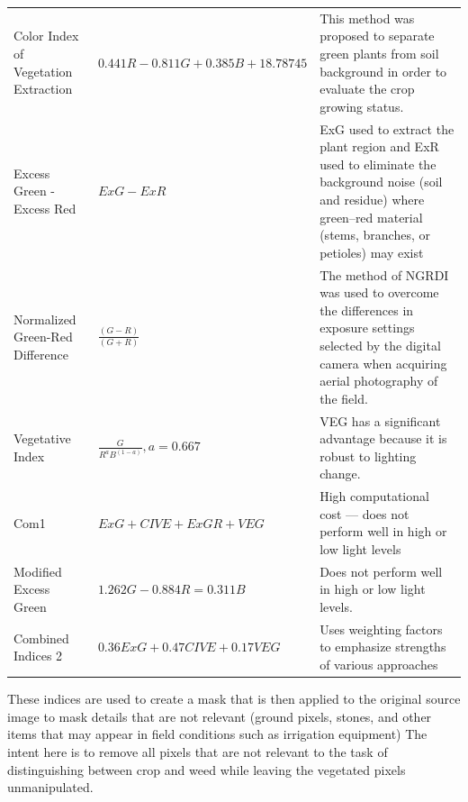 \documentclass[letterpaper]{report}
\begin{document}
{{\begin{longtable}{x{\dimexpr.25\tabcolsep}
                  x{\dimexpr.35\tabcolsep}
                  x{\dimexpr.4\tabcolsep}}
		Color Index of Vegetation Extraction      
		& $0.441 R - 0.811 G + 0.385 B + 18.78745$
		& This method was proposed to separate green plants from soil background in order to evaluate the crop growing status.
\tabularnewline\addlinespace

		Excess Green - Excess Red   
		& $ExG - ExR$ 
		& ExG used to extract the plant region and ExR used to eliminate the background noise (soil and residue) where green–red material (stems, branches, or petioles) may exist
\tabularnewline\addlinespace

		Normalized Green-Red Difference    
		& $\frac {(G - R)} {(G + R)}$ 
		& The method of NGRDI was used to overcome the differences in exposure settings selected by the digital camera when acquiring aerial photography of the field. 
\tabularnewline\addlinespace

		Vegetative Index      
		& $\frac {G} {R^aB^{(1-a)}}, a = 0.667$ 
		& VEG has a significant advantage because it is robust to lighting change.
\tabularnewline\addlinespace

		Com1   
		& $ExG + CIVE + ExGR + VEG$ 
		& High computational cost --- does not perform well in high or low light levels
\tabularnewline\addlinespace

		Modified Excess Green      
		& $1.262G - 0.884R = 0.311B$ 
		& Does not perform well in high or low light levels. 
\tabularnewline\addlinespace

		Combined Indices 2      
		& $0.36ExG + 0.47CIVE + 0.17VEG$ 
		& Uses weighting factors to emphasize strengths of various approaches
\label{table:indices}
\end{longtable}
}

These indices are used to create a mask that is then applied to the original source image to mask details that are not relevant (ground pixels, stones, and other items that may appear in field conditions such as irrigation equipment) The intent here is to remove all pixels that are not relevant to the task of distinguishing between crop and weed while leaving the vegetated pixels unmanipulated.

}
\end{document}
